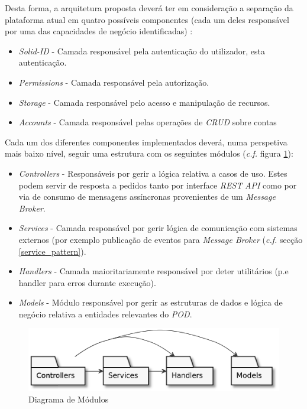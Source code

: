 Desta forma, a arquitetura proposta deverá ter em consideração a separação da plataforma atual em quatro possíveis componentes (cada um deles responsável por uma das capacidades de negócio identificadas) \cite{monolith_to_microservices}:
\begin{itemize}
    \item \emph{Solid-ID} - Camada responsável pela autenticação do utilizador, esta autenticação.
    \item \emph{Permissions} - Camada responsável pela autorização.
    \item \emph{Storage} - Camada responsável pelo acesso e manipulação de recursos.
    \item \emph{Accounts} - Camada responsável pelas operações de \emph{CRUD} sobre contas
\end{itemize}

Cada um dos diferentes componentes implementados deverá, numa perspetiva mais baixo nível, seguir uma estrutura com os seguintes módulos (\emph{c.f.} figura \ref{module_diagram}):

\begin{itemize}
    \item \emph{Controllers} - Responsáveis por gerir a lógica relativa a casos de uso. Estes podem servir de resposta a pedidos tanto por interface \emph{\acrshort{REST}} \emph{API} como por via de consumo de mensagens assíncronas provenientes de um \emph{Message Broker}.
    \item \emph{Services} - Camada responsável por gerir lógica de comunicação com sistemas externos (por exemplo publicação de eventos para \emph{Message Broker} (\emph{c.f.} secção \ref{service_pattern}).
    \item \emph{Handlers} - Camada maioritariamente responsável por deter utilitários (p.e handler para erros durante execução).
    \item \emph{Models} - Módulo responsável por gerir as estruturas de dados e lógica de negócio relativa a entidades relevantes do \emph{\acrshort{POD}}.
    \end{itemize}

\begin{figure}[H]
    \begin{center}
    \includegraphics[width=0.6 \textwidth]{figures/module_diagram.eps}
    \caption{Diagrama de Módulos}
    \label{module_diagram}
    \end{center}
\end{figure} 


